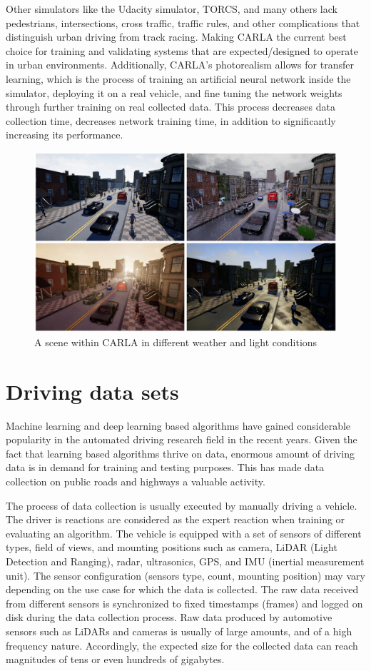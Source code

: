 Other simulators like the Udacity simulator, TORCS, and many others lack pedestrians, intersections, cross traffic, traffic rules, and other complications that distinguish urban driving from track racing. Making CARLA the current best choice for training and validating systems that are expected/designed to operate in urban environments. Additionally, CARLA's photorealism allows for transfer learning, which is the process of training an artificial neural network inside the simulator, deploying it on a real vehicle, and fine tuning the network weights through further training on real collected data. This process decreases data collection time, decreases network training time, in addition to significantly increasing its performance.
\begin{figure}[ht]
\includegraphics[width=\linewidth]{Figures/CARLA.jpg}
\centering
\caption{A scene within CARLA in different weather and light conditions}
\end{figure}
\pagebreak

\section{Driving data sets}
Machine learning and deep learning based algorithms have gained considerable popularity in the automated driving research field in the recent years. Given the fact that learning based algorithms thrive on data, enormous amount of driving data is in demand for training and testing purposes. This has made data collection on public roads and highways a valuable activity.

The process of data collection is usually executed by manually driving a vehicle. The driver is reactions are considered as the expert reaction when training or evaluating an algorithm. The vehicle is equipped with a set of sensors of different types, field of views, and mounting positions such as camera, LiDAR (Light Detection and Ranging), radar, ultrasonics, GPS, and IMU (inertial measurement unit). The sensor configuration (sensors type, count, mounting position) may vary depending on the use case for which the data is collected. The raw data received from different sensors is synchronized to fixed timestamps (frames) and logged on disk during the data collection process. Raw data produced by automotive sensors such as LiDARs and cameras is usually of large amounts, and of a high frequency nature. Accordingly, the expected size for the collected data can reach magnitudes of tens or even hundreds of gigabytes.

